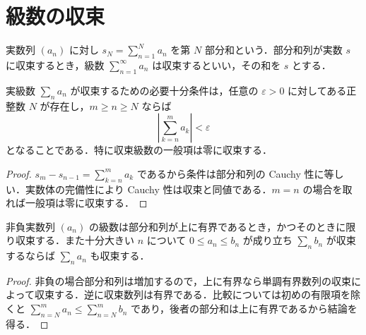 \section{級数の収束}
\begin{defn}[実級数]
実数列 $(a_n)$ に対し $s_N=\sum_{n=1}^N a_n$ を第 $N$ 部分和という．部分和列が実数 $s$ に収束するとき，級数 $\sum_{n=1}^\infty a_n$ は収束するといい，その和を $s$ とする．
\end{defn}
\begin{prop}[級数のCauchy判定]
実級数 $\sum_n a_n$ が収束するための必要十分条件は，任意の $\varepsilon>0$ に対してある正整数 $N$ が存在し，$m\geq n\geq N$ ならば
\[
 \left|\sum_{k=n}^m a_k\right|<\varepsilon
\]
となることである．特に収束級数の一般項は零に収束する．
\end{prop}
\begin{proof}
$s_m-s_{n-1}=\sum_{k=n}^m a_k$ であるから条件は部分和列の Cauchy 性に等しい．実数体の完備性により Cauchy 性は収束と同値である．$m=n$ の場合を取れば一般項は零に収束する．
\end{proof}
\begin{prop}[非負級数の収束と比較判定]
非負実数列 $(a_n)$ の級数は部分和列が上に有界であるとき，かつそのときに限り収束する．また十分大きい $n$ について $0\leq a_n\leq b_n$ が成り立ち $\sum_n b_n$ が収束するならば $\sum_n a_n$ も収束する．
\end{prop}
\begin{proof}
非負の場合部分和列は増加するので，上に有界なら単調有界数列の収束によって収束する．逆に収束数列は有界である．比較については初めの有限項を除くと $\sum_{n=N}^m a_n\leq\sum_{n=N}^m b_n$ であり，後者の部分和は上に有界であるから結論を得る．
\end{proof}
